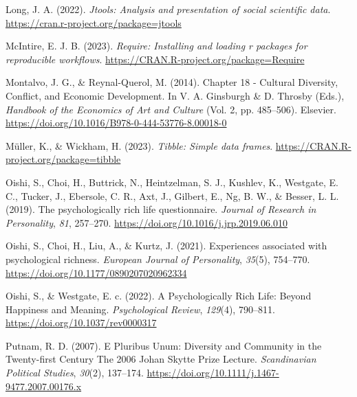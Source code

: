 \documentclass[
  man,floatsintext]{apa7}
\newlength{\cslhangindent}
\newlength{\cslentryspacingunit} %
\newenvironment{CSLReferences}[2] %
 {%
  \setlength{\parindent}{0pt}
  \ifodd #1
  \let\oldpar\par
  \def\par{\hangindent=\cslhangindent\oldpar}
  \fi
  \setlength{\parskip}{#2\cslentryspacingunit}
 }%
 {}
\begin{document}
\begin{CSLReferences}{1}{0}
\leavevmode{}%
Long, J. A. (2022). \emph{Jtools: Analysis and presentation of social scientific data}. \url{https://cran.r-project.org/package=jtools}

\leavevmode{}%
McIntire, E. J. B. (2023). \emph{Require: Installing and loading r packages for reproducible workflows}. \url{https://CRAN.R-project.org/package=Require}

\leavevmode{}%
Montalvo, J. G., \& Reynal-Querol, M. (2014). Chapter 18 - {Cultural Diversity}, {Conflict}, and {Economic Development}. In V. A. Ginsburgh \& D. Throsby (Eds.), \emph{Handbook of the {Economics} of {Art} and {Culture}} (Vol. 2, pp. 485--506). Elsevier. \url{https://doi.org/10.1016/B978-0-444-53776-8.00018-0}

\leavevmode{}%
Müller, K., \& Wickham, H. (2023). \emph{Tibble: Simple data frames}. \url{https://CRAN.R-project.org/package=tibble}

\leavevmode{}%
Oishi, S., Choi, H., Buttrick, N., Heintzelman, S. J., Kushlev, K., Westgate, E. C., Tucker, J., Ebersole, C. R., Axt, J., Gilbert, E., Ng, B. W., \& Besser, L. L. (2019). The psychologically rich life questionnaire. \emph{Journal of Research in Personality}, \emph{81}, 257--270. \url{https://doi.org/10.1016/j.jrp.2019.06.010}

\leavevmode{}%
Oishi, S., Choi, H., Liu, A., \& Kurtz, J. (2021). Experiences associated with psychological richness. \emph{European Journal of Personality}, \emph{35}(5), 754--770. \url{https://doi.org/10.1177/0890207020962334}

\leavevmode{}%
Oishi, S., \& Westgate, E. c. (2022). A {Psychologically Rich Life}: {Beyond Happiness} and {Meaning}. \emph{Psychological Review}, \emph{129}(4), 790--811. \url{https://doi.org/10.1037/rev0000317}

\leavevmode{}%
Putnam, R. D. (2007). E {Pluribus Unum}: {Diversity} and {Community} in the {Twenty-first Century The} 2006 {Johan Skytte Prize Lecture}. \emph{Scandinavian Political Studies}, \emph{30}(2), 137--174. \url{https://doi.org/10.1111/j.1467-9477.2007.00176.x}


\end{CSLReferences}
\end{document}
